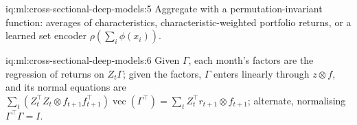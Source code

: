 \begin{solution}{iq:ml:cross-sectional-deep-models:5}
Aggregate with a permutation-invariant function: averages of characteristics, characteristic-weighted portfolio returns,
or a learned set encoder $\rho(\sum_i\phi(x_i))$.
\end{solution}

\begin{solution}{iq:ml:cross-sectional-deep-models:6}
Given $\Gamma$, each month's factors are the regression of returns on $Z_t\Gamma$; given the factors, $\Gamma$ enters linearly
through $z\otimes f$, and its normal equations are $\sum_t(Z_t^\top Z_t\otimes f_{t+1}f_{t+1}^\top)\operatorname{vec}(\Gamma^\top)
= \sum_tZ_t^\top r_{t+1}\otimes f_{t+1}$; alternate, normalising $\Gamma^\top\Gamma = I$.
\end{solution}
